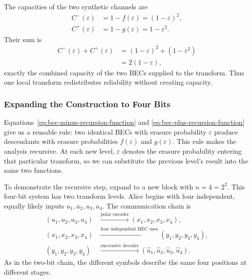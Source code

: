 The capacities of the two synthetic channels are
\begin{align}
C^-(\varepsilon)&=1-f(\varepsilon)=(1-\varepsilon)^2,
\label{eq:bec-minus-capacity}\\
C^+(\varepsilon)&=1-g(\varepsilon)=1-\varepsilon^2.
\label{eq:bec-plus-capacity}
\end{align}
Their sum is
\begin{subequations}
\label{eq:bec-local-capacity-conservation}
\begin{align}
C^-(\varepsilon)+C^+(\varepsilon)
&=(1-\varepsilon)^2+(1-\varepsilon^2)
\label{eq:bec-local-capacity-conservation-expand}\\
&=2(1-\varepsilon),
\label{eq:bec-local-capacity-conservation-result}
\end{align}
\end{subequations}
exactly the combined capacity of the two BECs supplied to the transform. Thus one local transform redistributes reliability without creating capacity.

\subsubsection{Expanding the Construction to Four Bits}

Equations~\eqref{eq:bec-minus-recursion-function} and \eqref{eq:bec-plus-recursion-function} give us a reusable rule: two identical BECs with erasure probability $\varepsilon$ produce descendants with erasure probabilities $f(\varepsilon)$ and $g(\varepsilon)$. This rule makes the analysis recursive. At each new level, $\varepsilon$ denotes the erasure probability entering that particular transform, so we can substitute the previous level's result into the same two functions.

To demonstrate the recursive step, expand to a new block with $n=4=2^2$. This four-bit system has two transform levels. Alice begins with four independent, equally likely inputs $u_1,u_2,u_3,u_4$. The communication chain is
\begin{equation}
\begin{aligned}
(u_1,u_2,u_3,u_4)
&\xrightarrow{\text{polar encoder}}
(x_1,x_2,x_3,x_4),\\
(x_1,x_2,x_3,x_4)
&\xrightarrow{\text{four independent BEC uses}}
(y_1,y_2,y_3,y_4),\\
(y_1,y_2,y_3,y_4)
&\xrightarrow{\text{successive decoder}}
(\hat u_1,\hat u_2,\hat u_3,\hat u_4).
\end{aligned}
\label{eq:bec-four-bit-communication-chain}
\end{equation}
As in the two-bit chain, the different symbols describe the same four positions at different stages.

